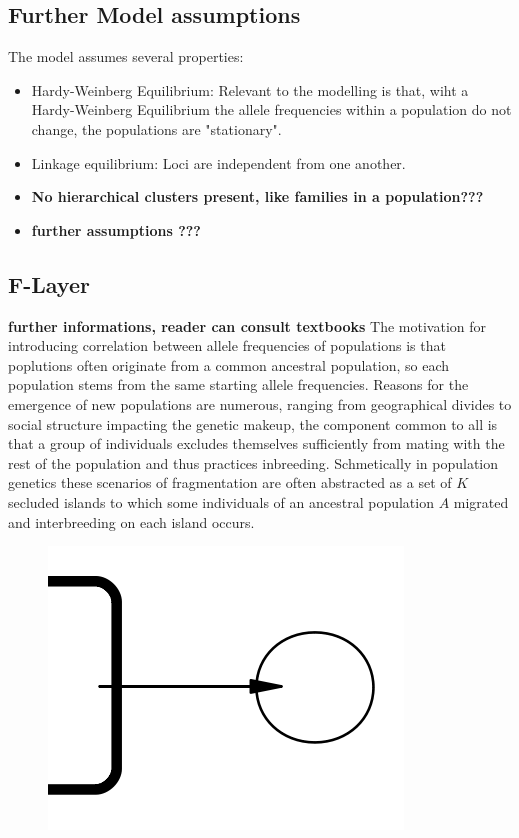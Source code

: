 \documentclass[a4paper, 11pt]{article}
\begin{document}
\subsection{Further Model assumptions}
The model assumes several properties:
\begin{itemize}
\item Hardy-Weinberg Equilibrium: Relevant to the modelling is that, wiht a Hardy-Weinberg Equilibrium the allele frequencies within a population do not change, the populations are "stationary".

\item Linkage equilibrium: Loci are independent from one another.

\item \textbf{No hierarchical clusters present, like families in a population???}

\item \textbf{further assumptions ???}
\end{itemize}

\subsection{F-Layer}

\textbf{further informations, reader can consult textbooks}
The motivation for introducing correlation between allele frequencies of populations is that poplutions often originate from a common ancestral population, so each population stems from the same starting allele frequencies. Reasons for the emergence of new populations are numerous, ranging from geographical divides to social structure impacting the genetic makeup, the component common to all is that a group of individuals excludes themselves sufficiently from mating with the rest of the population and thus practices inbreeding. Schmetically in population genetics these scenarios of fragmentation are often abstracted as a set of $K$ secluded islands to which some individuals of an ancestral population $A$ migrated and interbreeding on each island occurs.

\begin{figure}
\includegraphics[scale=0.5]{level_1}
\end{figure}
\end{document}
